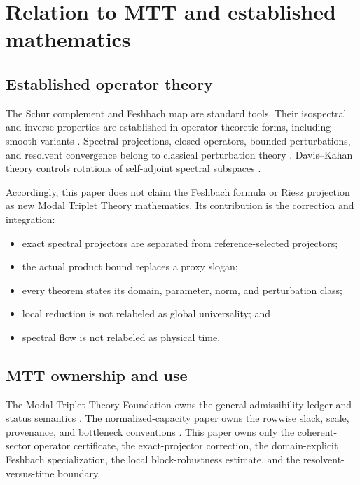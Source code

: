 \documentclass[11pt]{article}
\theoremstyle{definition}
\theoremstyle{remark}
\newcommand{\1}{\mathbf 1}
\newcommand{\MTT}{Modal Triplet Theory}
\begin{document}
\section{Relation to MTT and established mathematics}
\label{sec:relation}

\subsection{Established operator theory}

The Schur complement and Feshbach map are standard tools.  Their
isospectral and inverse properties are established in operator-theoretic
forms, including smooth variants
\cite{Feshbach1962,GriesemerHasler2008}.  Spectral projections, closed
operators, bounded perturbations, and resolvent convergence belong to
classical perturbation theory \cite{Kato1995,ReedSimonI1980}.
Davis--Kahan theory controls rotations of self-adjoint spectral subspaces
\cite{DavisKahan1970}.

Accordingly, this paper does not claim the Feshbach formula or Riesz
projection as new \MTT{} mathematics.  Its contribution is the correction
and integration:
\begin{itemize}[leftmargin=2em]
\item exact spectral projectors are separated from reference-selected
      projectors;
\item the actual product bound replaces a proxy slogan;
\item every theorem states its domain, parameter, norm, and perturbation
      class;
\item local reduction is not relabeled as global universality; and
\item spectral flow is not relabeled as physical time.
\end{itemize}

\subsection{MTT ownership and use}

The \MTT{} Foundation owns the general admissibility ledger and status
semantics \cite{MTTFoundation2026}.  The normalized-capacity paper owns
the rowwise slack, scale, provenance, and bottleneck conventions
\cite{CapacityMargin2026}.  This paper owns only the coherent-sector
operator certificate, the exact-projector correction, the domain-explicit
Feshbach specialization, the local block-robustness estimate, and the
resolvent-versus-time boundary.
\end{document}
